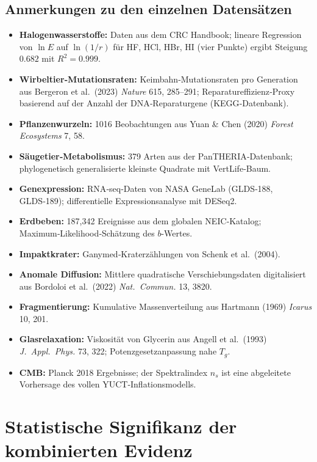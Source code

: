 \documentclass[11pt,a4paper]{article}
\begin{document}
	\subsection*{Anmerkungen zu den einzelnen Datensätzen}
	\begin{itemize}
		\item \textbf{Halogenwasserstoffe:} Daten aus dem CRC Handbook; lineare Regression von \(\ln E\) auf \(\ln(1/r)\) für HF, HCl, HBr, HI (vier Punkte) ergibt Steigung \(0.682\) mit \(R^2=0.999\).
		\item \textbf{Wirbeltier‑Mutationsraten:} Keimbahn‑Mutationsraten pro Generation aus Bergeron et al.\ (2023) \textit{Nature} 615, 285–291; Reparatureffizienz‑Proxy basierend auf der Anzahl der DNA‑Reparaturgene (KEGG‑Datenbank).
		\item \textbf{Pflanzenwurzeln:} 1016 Beobachtungen aus Yuan \& Chen (2020) \textit{Forest Ecosystems} 7, 58.
		\item \textbf{Säugetier‑Metabolismus:} 379 Arten aus der PanTHERIA‑Datenbank; phylogenetisch generalisierte kleinste Quadrate mit VertLife‑Baum.
		\item \textbf{Genexpression:} RNA‑seq‑Daten von NASA GeneLab (GLDS‑188, GLDS‑189); differentielle Expressionsanalyse mit DESeq2.
		\item \textbf{Erdbeben:} 187,342 Ereignisse aus dem globalen NEIC‑Katalog; Maximum‑Likelihood‑Schätzung des \(b\)-Wertes.
		\item \textbf{Impaktkrater:} Ganymed‑Kraterzählungen von Schenk et al.\ (2004).
		\item \textbf{Anomale Diffusion:} Mittlere quadratische Verschiebungsdaten digitalisiert aus Bordoloi et al.\ (2022) \textit{Nat.\ Commun.} 13, 3820.
		\item \textbf{Fragmentierung:} Kumulative Massenverteilung aus Hartmann (1969) \textit{Icarus} 10, 201.
		\item \textbf{Glasrelaxation:} Viskosität von Glycerin aus Angell et al.\ (1993) \textit{J.\ Appl.\ Phys.} 73, 322; Potenzgesetzanpassung nahe \(T_g\).
		\item \textbf{CMB:} Planck 2018 Ergebnisse; der Spektralindex \(n_s\) ist eine abgeleitete Vorhersage des vollen YUCT‑Inflationsmodells.
	\end{itemize}
	
	\section{Statistische Signifikanz der kombinierten Evidenz}
	
\end{document}
